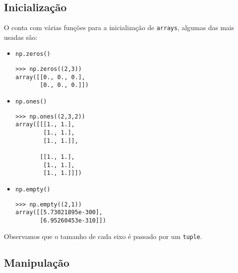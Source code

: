 \subsection{Inicialização}

O {\numpy} conta com várias funções para a inicialização de \lstinline+arrays+, algumas das mais usadas são:
\begin{itemize}
\item \lstinline+np.zeros()+ 

\begin{lstlisting}
>>> np.zeros((2,3))
array([[0., 0., 0.],
       [0., 0., 0.]])
\end{lstlisting}

\item \lstinline+np.ones()+ 

\begin{lstlisting}
>>> np.ones((2,3,2))
array([[[1., 1.],
        [1., 1.],
        [1., 1.]],

       [[1., 1.],
        [1., 1.],
        [1., 1.]]])
\end{lstlisting}

\item \lstinline+np.empty()+ 

\begin{lstlisting}
>>> np.empty((2,1))
array([[5.73021895e-300],
       [6.95260453e-310]])
\end{lstlisting}

\end{itemize}
Observamos que o tamanho de cada eixo é passado por um \lstinline+tuple+.

\subsection{Manipulação}

